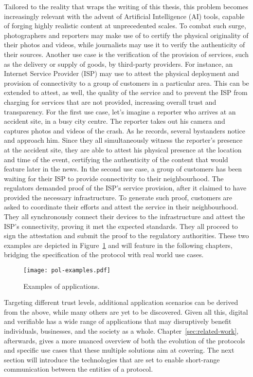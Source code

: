 Tailored to the reality that wraps the writing of this thesis, this problem becomes increasingly relevant with the advent of Artificial Intelligence (AI) tools, capable of forging highly realistic content at unprecedented scales. To combat such surge, photographers and reporters may make use of \pol{} to certify the physical originality of their photos and videos, while journalists may use it to verify the authenticity of their sources. Another use case is the verification of the provision of services, such as the delivery or supply of goods, by third-party providers. For instance, an Internet Service Provider (ISP) may use \pol{} to attest the physical deployment and provision of connectivity to a group of customers in a particular area. This can be extended to attest, as well, the quality of the service and to prevent the ISP from charging for services that are not provided, increasing overall trust and transparency. For the first use case, let's imagine a reporter who arrives at an accident site, in a busy city centre. The reporter takes out his camera and captures photos and videos of the crash. As he records, several bystanders notice and approach him. Since they all simultaneously witness the reporter's presence at the accident site, they are able to attest his physical presence at the location and time of the event, certifying the authenticity of the content that would feature later in the news. In the second use case, a group of customers has been waiting for their ISP to provide connectivity to their neighbourhood. The regulators demanded proof of the ISP's service provision, after it claimed to have provided the necessary infrastructure. To generate such proof, customers are asked to coordinate their efforts and attest the service in their neighbourhood. They all synchronously connect their devices to the infrastructure and attest the ISP's connectivity, proving it met the expected standards. They all proceed to sign the attestation and submit the proof to the regulatory authorities. These two examples are depicted in Figure~\ref{fig:proof-of-location-example-scenarios} and will feature in the following chapters, bridging the specification of the \pol{} protocol with real world use cases.

\begin{figure}[h!]
    \begin{center}
    \texttt{[image: pol-examples.pdf]}
    \caption{Examples of \pol{} applications.}
    \vspace{-0.5cm}
    \label{fig:proof-of-location-example-scenarios}
    \end{center}
\end{figure}

Targeting different trust levels, additional application scenarios can be derived from the above, while many others are yet to be discovered. Given all this, digital and verifiable \pol{} has a wide range of applications that may disruptively benefit individuals, businesses, and the society as a whole. Chapter~\ref{sec:related-work}, afterwards, gives a more nuanced overview of both the evolution of the protocols and specific use cases that these multiple solutions aim at covering. The next section will introduce the technologies that are set to enable short-range communication between the entities of a \pol{} protocol.